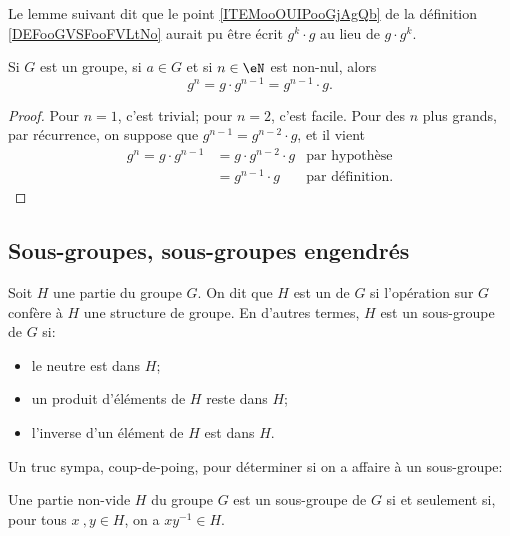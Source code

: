 Le lemme suivant dit que le point \ref{ITEMooOUIPooGjAgQb} de la définition \ref{DEFooGVSFooFVLtNo} aurait pu être écrit \( g^k\cdot g\) au lieu de \( g\cdot g^k\).
\begin{lemma}        \label{LEMooWPARooYLZlzr}
    Si \( G\) est un groupe, si \( a\in G \) et si \( n\in \eN\) est non-nul, alors
    \begin{equation}
        g^n=g\cdot g^{n-1}=g^{n-1}\cdot g.
    \end{equation}
\end{lemma}
\begin{proof}
Pour \( n = 1 \), c'est trivial; pour \( n = 2 \), c'est facile. Pour des \( n \) plus grands, par récurrence, on suppose que \( g^{n-1} = g^{n-2}\cdot g \), et il vient 
\begin{align}
 g^n = g\cdot g^{n-1} &= g\cdot  g^{n-2}\cdot g  &\text{par hypothèse}\\
 & = g^{n-1}\cdot g &\text{par définition}.
 \end{align}
\end{proof}

\subsection{Sous-groupes, sous-groupes engendrés}

\begin{definition}
    Soit \( H\) une partie du groupe \( G\). On dit que \( H \) est un  de \( G \) si l'opération sur \( G\) confère à \( H\) une structure de groupe. En d'autres termes, \( H \) est un sous-groupe de \( G \) si:
\begin{itemize}
    \item le neutre est dans \( H\);
    \item un produit d'éléments de \( H\) reste dans \( H\);
    \item l'inverse d'un élément de \( H\) est dans \( H\).
\end{itemize}
\end{definition}

Un truc sympa, coup-de-poing, pour déterminer si on a affaire à un sous-groupe:

\begin{proposition}
Une partie non-vide \( H\) du groupe \( G\) est un sous-groupe de \( G \) si et seulement si, pour tous \(x\ ,y \in H\), on a \( xy^{-1} \in H\).
\end{proposition}


